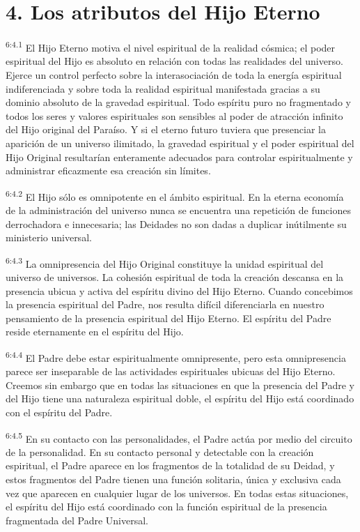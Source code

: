 \section*{4. Los atributos del Hijo Eterno}
\par
\textsuperscript{6:4.1} El Hijo Eterno motiva el nivel espiritual de la realidad cósmica; el poder espiritual del Hijo es absoluto en relación con todas las realidades del universo. Ejerce un control perfecto sobre la interasociación de toda la energía espiritual indiferenciada y sobre toda la realidad espiritual manifestada gracias a su dominio absoluto de la gravedad espiritual. Todo espíritu puro no fragmentado y todos los seres y valores espirituales son sensibles al poder de atracción infinito del Hijo original del Paraíso. Y si el eterno futuro tuviera que presenciar la aparición de un universo ilimitado, la gravedad espiritual y el poder espiritual del Hijo Original resultarían enteramente adecuados para controlar espiritualmente y administrar eficazmente esa creación sin límites.

\par
\textsuperscript{6:4.2} El Hijo sólo es omnipotente en el ámbito espiritual. En la eterna economía de la administración del universo nunca se encuentra una repetición de funciones derrochadora e innecesaria; las Deidades no son dadas a duplicar inútilmente su ministerio universal.

\par
\textsuperscript{6:4.3} La omnipresencia del Hijo Original constituye la unidad espiritual del universo de universos. La cohesión espiritual de toda la creación descansa en la presencia ubicua y activa del espíritu divino del Hijo Eterno. Cuando concebimos la presencia espiritual del Padre, nos resulta difícil diferenciarla en nuestro pensamiento de la presencia espiritual del Hijo Eterno. El espíritu del Padre reside eternamente en el espíritu del Hijo.

\par
\textsuperscript{6:4.4} El Padre debe estar espiritualmente omnipresente, pero esta omnipresencia parece ser inseparable de las actividades espirituales ubicuas del Hijo Eterno. Creemos sin embargo que en todas las situaciones en que la presencia del Padre y del Hijo tiene una naturaleza espiritual doble, el espíritu del Hijo está coordinado con el espíritu del Padre.

\par
\textsuperscript{6:4.5} En su contacto con las personalidades, el Padre actúa por medio del circuito de la personalidad. En su contacto personal y detectable con la creación espiritual, el Padre aparece en los fragmentos de la totalidad de su Deidad, y estos fragmentos del Padre tienen una función solitaria, única y exclusiva cada vez que aparecen en cualquier lugar de los universos. En todas estas situaciones, el espíritu del Hijo está coordinado con la función espiritual de la presencia fragmentada del Padre Universal.

